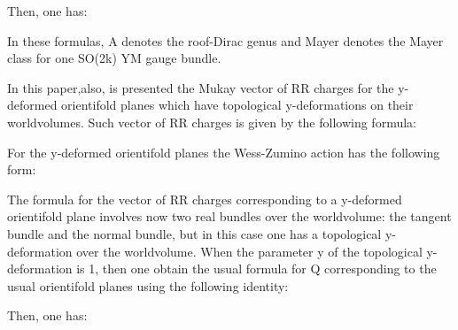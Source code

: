 \documentclass[a4paper,a4paper]{article}
\begin{document}
\begin{center}
 
{  \coordHE{}}
\end{center} 

Then, one has:

\begin{center}
{  \coordHE{} }
\end{center}

\begin{center}
{  \coordHE{} }
\end{center}

In these formulas, A denotes the roof-Dirac genus and Mayer denotes the Mayer class for one SO(2k) YM gauge bundle.

In this paper,also, is presented the Mukay vector of RR charges for the y-deformed  orientifold planes which have topological y-deformations on their worldvolumes.  Such vector of RR charges is given by the following formula:

\begin{center}
{  \coordHE{} }
\end{center}

For the y-deformed  orientifold planes the Wess-Zumino action has the following form:

\begin{center}
{  \coordHE{} }
\end{center}
The formula for the vector of RR charges corresponding to a y-deformed orientifold plane involves now two real bundles over the worldvolume: the 
tangent bundle and  the normal bundle, but in this case one has a topological y-deformation over the worldvolume.
When the parameter y of the topological y-deformation is 1, then one obtain the usual formula for Q corresponding to the usual orientifold planes using the following identity:
\begin{center}
 
{  \coordHE{}}
\end{center} 
Then, one has:
\begin{center}
{  \coordHE{} }
\end{center}
\end{document}
